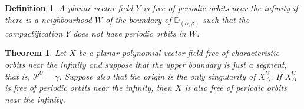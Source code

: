 \documentclass[12pt]{amsart}
\newtheorem{definition}[theorem]{Definition}
\newtheorem{mtheorem}{Theorem}
\begin{document}
\begin{definition}
A planar vector field $Y$ is \emph{free of periodic orbits near the infinity} if there is a neighbourhood $W$ of the boundary of $\mathbb{D}_{(\alpha,\beta)}$ such that the compactification $\overline{Y}$ does not have periodic orbits in $W$.
\end{definition}

\begin{mtheorem}\label{main-theorem-particular-case}
Let $X$ be a planar polynomial vector field free of characteristic orbits near the infinity and suppose that the upper boundary is just a segment, that is, $\mathcal{P}^{U} = \gamma$. Suppose also that the origin is the only singularity of $X_{\Delta}^{U}$. If $X_{\Delta}^{U}$ is free of periodic orbits near the infinity, then $X$ is also free of periodic orbits near the infinity.   
\end{mtheorem}
\end{document}

